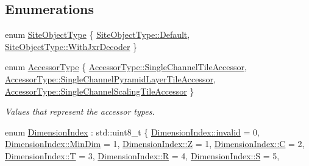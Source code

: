 \subsection*{Enumerations}
\begin{DoxyCompactItemize}
\item 
enum \hyperlink{namespacelib_c_z_i_a77743727a5f0709a64237e58b9254983}{Site\+Object\+Type} \{ \hyperlink{namespacelib_c_z_i_a77743727a5f0709a64237e58b9254983a7a1920d61156abc05a60135aefe8bc67}{Site\+Object\+Type\+::\+Default}, 
\hyperlink{namespacelib_c_z_i_a77743727a5f0709a64237e58b9254983a6cdacd623c3a47d457783e5410437a42}{Site\+Object\+Type\+::\+With\+Jxr\+Decoder}
 \}
\item 
enum \hyperlink{namespacelib_c_z_i_aa626474324df92c9cdc7258cdb1e677c}{Accessor\+Type} \{ \hyperlink{namespacelib_c_z_i_aa626474324df92c9cdc7258cdb1e677ca0e2de81425cb9e8bf8cc720f158dda7a}{Accessor\+Type\+::\+Single\+Channel\+Tile\+Accessor}, 
\hyperlink{namespacelib_c_z_i_aa626474324df92c9cdc7258cdb1e677ca371b0260cc2165a52c4b4addd2fe4986}{Accessor\+Type\+::\+Single\+Channel\+Pyramid\+Layer\+Tile\+Accessor}, 
\hyperlink{namespacelib_c_z_i_aa626474324df92c9cdc7258cdb1e677cae5c28a1e209fa4abe7f13039724c5a6c}{Accessor\+Type\+::\+Single\+Channel\+Scaling\+Tile\+Accessor}
 \}\begin{DoxyCompactList}\small\item\em Values that represent the accessor types. \end{DoxyCompactList}
\item 
enum \hyperlink{namespacelib_c_z_i_a55049658acf59d0eddfaebcad16df424}{Dimension\+Index} \+: std\+::uint8\+\_\+t \{ \newline
\hyperlink{namespacelib_c_z_i_a55049658acf59d0eddfaebcad16df424afedb2d84cafe20862cb4399751a8a7e3}{Dimension\+Index\+::invalid} = 0, 
\hyperlink{namespacelib_c_z_i_a55049658acf59d0eddfaebcad16df424a4664bf19d8f3ef0300bc3d7170ea139f}{Dimension\+Index\+::\+Min\+Dim} = 1, 
\hyperlink{namespacelib_c_z_i_a55049658acf59d0eddfaebcad16df424a21c2e59531c8710156d34a3c30ac81d5}{Dimension\+Index\+::Z} = 1, 
\hyperlink{namespacelib_c_z_i_a55049658acf59d0eddfaebcad16df424a0d61f8370cad1d412f80b84d143e1257}{Dimension\+Index\+::C} = 2, 
\newline
\hyperlink{namespacelib_c_z_i_a55049658acf59d0eddfaebcad16df424ab9ece18c950afbfa6b0fdbfa4ff731d3}{Dimension\+Index\+::T} = 3, 
\hyperlink{namespacelib_c_z_i_a55049658acf59d0eddfaebcad16df424ae1e1d3d40573127e9ee0480caf1283d6}{Dimension\+Index\+::R} = 4, 
\hyperlink{namespacelib_c_z_i_a55049658acf59d0eddfaebcad16df424a5dbc98dcc983a70728bd082d1a47546e}{Dimension\+Index\+::S} = 5, 

\end{DoxyCompactItemize}

